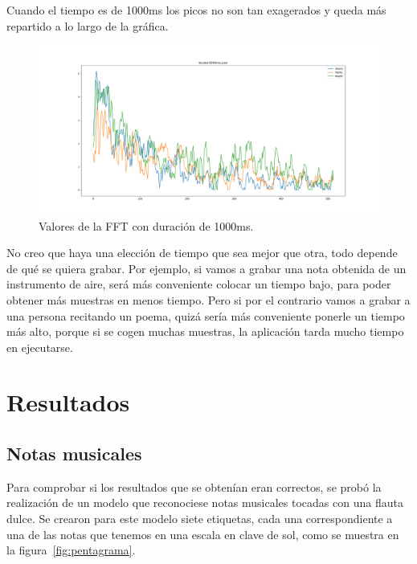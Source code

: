 \documentclass[a4paper, 12pt]{book}
\begin{document}
Cuando el tiempo es de 1000ms los picos no son tan exagerados y queda más repartido a lo largo de la gráfica.

\begin{figure}
	\centering
	\includegraphics[width=12cm, keepaspectratio]{img/locutor1000ms.png}
	\caption{Valores de la FFT con duración de 1000ms.}\label{fig:locutor1000ms}
\end{figure}

No creo que haya una elección de tiempo que sea mejor que otra, todo depende de qué se quiera grabar. Por ejemplo, si vamos a grabar una nota obtenida de un instrumento de aire, será más conveniente colocar un tiempo bajo, para poder obtener más muestras en menos tiempo. Pero si por el contrario vamos a grabar a una persona recitando un poema, quizá sería más conveniente ponerle un tiempo más alto, porque si se cogen muchas muestras, la aplicación tarda mucho tiempo en ejecutarse.



\cleardoublepage
\chapter{Resultados}
\label{chap:resultados}

\section{Notas musicales}
\label{sec:notas-musicales-res}

Para comprobar si los resultados que se obtenían eran correctos, se probó la realización de un modelo que reconociese notas musicales tocadas con una flauta dulce. Se crearon para este modelo siete etiquetas, cada una correspondiente a una de las notas que tenemos en una escala en clave de sol, como se muestra en la figura~\ref{fig:pentagrama}.
\end{document}
